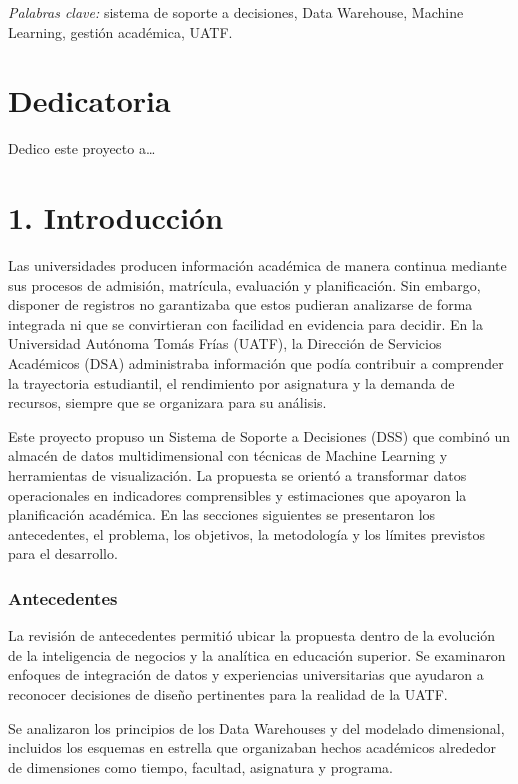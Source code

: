 \documentclass[11pt,oneside,openany]{book}
\begin{document}
\medskip
\noindent\emph{Palabras clave:} sistema de soporte a decisiones, Data Warehouse, Machine Learning, gestión académica, UATF.
\endgroup

\chapter*{Dedicatoria}
Dedico este proyecto a\ldots{}

\tableofcontents
\setcounter{chapter}{0}
\chapter*{1. Introducción}

Las universidades producen información académica de manera continua mediante sus procesos de admisión, matrícula, evaluación y planificación. Sin embargo, disponer de registros no garantizaba que estos pudieran analizarse de forma integrada ni que se convirtieran con facilidad en evidencia para decidir. En la Universidad Autónoma Tomás Frías (UATF), la Dirección de Servicios Académicos (DSA) administraba información que podía contribuir a comprender la trayectoria estudiantil, el rendimiento por asignatura y la demanda de recursos, siempre que se organizara para su análisis.

Este proyecto propuso un Sistema de Soporte a Decisiones (DSS) que combinó un almacén de datos multidimensional con técnicas de Machine Learning y herramientas de visualización. La propuesta se orientó a transformar datos operacionales en indicadores comprensibles y estimaciones que apoyaron la planificación académica. En las secciones siguientes se presentaron los antecedentes, el problema, los objetivos, la metodología y los límites previstos para el desarrollo.

\subsection*{Antecedentes}

La revisión de antecedentes permitió ubicar la propuesta dentro de la evolución de la inteligencia de negocios y la analítica en educación superior. Se examinaron enfoques de integración de datos y experiencias universitarias que ayudaron a reconocer decisiones de diseño pertinentes para la realidad de la UATF.

Se analizaron los principios de los Data Warehouses y del modelado dimensional, incluidos los esquemas en estrella que organizaban hechos académicos alrededor de dimensiones como tiempo, facultad, asignatura y programa.
\end{document}

